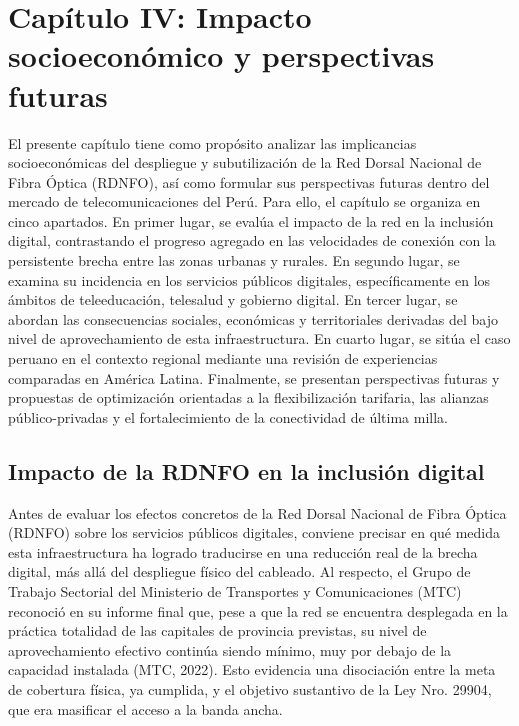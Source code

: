 \section{Capítulo IV: Impacto socioeconómico y perspectivas futuras}
El presente capítulo tiene como propósito analizar las implicancias socioeconómicas del despliegue y subutilización de la Red Dorsal Nacional de Fibra Óptica (RDNFO), así como formular sus perspectivas futuras dentro del mercado de telecomunicaciones del Perú. Para ello, el capítulo se organiza en cinco apartados. En primer lugar, se evalúa el impacto de la red en la inclusión digital, contrastando el progreso agregado en las velocidades de conexión con la persistente brecha entre las zonas urbanas y rurales. En segundo lugar, se examina su incidencia en los servicios públicos digitales, específicamente en los ámbitos de teleeducación, telesalud y gobierno digital. En tercer lugar, se abordan las consecuencias sociales, económicas y territoriales derivadas del bajo nivel de aprovechamiento de esta infraestructura. En cuarto lugar, se sitúa el caso peruano en el contexto regional mediante una revisión de experiencias comparadas en América Latina. Finalmente, se presentan perspectivas futuras y propuestas de optimización orientadas a la flexibilización tarifaria, las alianzas público-privadas y el fortalecimiento de la conectividad de última milla.

\subsection{Impacto de la RDNFO en la inclusión digital}
Antes de evaluar los efectos concretos de la Red Dorsal Nacional de Fibra Óptica (RDNFO) sobre los servicios públicos digitales, conviene precisar en qué medida esta infraestructura ha logrado traducirse en una reducción real de la brecha digital, más allá del despliegue físico del cableado. Al respecto, el Grupo de Trabajo Sectorial del Ministerio de Transportes y Comunicaciones (MTC) reconoció en su informe final que, pese a que la red se encuentra desplegada en la práctica totalidad de las capitales de provincia previstas, su nivel de aprovechamiento efectivo continúa siendo mínimo, muy por debajo de la capacidad instalada (MTC, 2022). Esto evidencia una disociación entre la meta de cobertura física, ya cumplida, y el objetivo sustantivo de la Ley Nro. 29904, que era masificar el acceso a la banda ancha.

